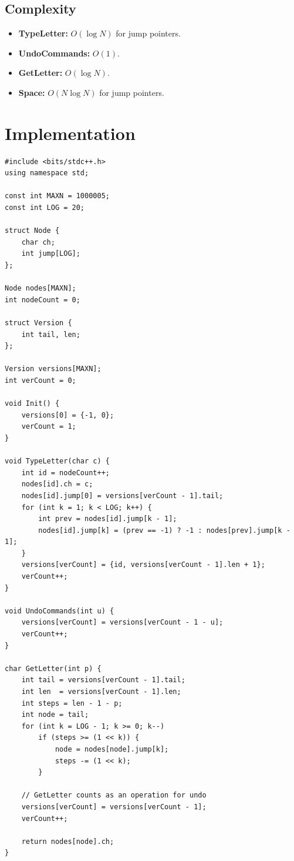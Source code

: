 \documentclass[11pt,a4paper]{article}
\begin{document}
\subsection{Complexity}
\begin{itemize}
    \item \textbf{TypeLetter:} $O(\log N)$ for jump pointers.
    \item \textbf{UndoCommands:} $O(1)$.
    \item \textbf{GetLetter:} $O(\log N)$.
    \item \textbf{Space:} $O(N \log N)$ for jump pointers.
\end{itemize}

\section{Implementation}

\begin{lstlisting}
#include <bits/stdc++.h>
using namespace std;

const int MAXN = 1000005;
const int LOG = 20;

struct Node {
    char ch;
    int jump[LOG];
};

Node nodes[MAXN];
int nodeCount = 0;

struct Version {
    int tail, len;
};

Version versions[MAXN];
int verCount = 0;

void Init() {
    versions[0] = {-1, 0};
    verCount = 1;
}

void TypeLetter(char c) {
    int id = nodeCount++;
    nodes[id].ch = c;
    nodes[id].jump[0] = versions[verCount - 1].tail;
    for (int k = 1; k < LOG; k++) {
        int prev = nodes[id].jump[k - 1];
        nodes[id].jump[k] = (prev == -1) ? -1 : nodes[prev].jump[k - 1];
    }
    versions[verCount] = {id, versions[verCount - 1].len + 1};
    verCount++;
}

void UndoCommands(int u) {
    versions[verCount] = versions[verCount - 1 - u];
    verCount++;
}

char GetLetter(int p) {
    int tail = versions[verCount - 1].tail;
    int len  = versions[verCount - 1].len;
    int steps = len - 1 - p;
    int node = tail;
    for (int k = LOG - 1; k >= 0; k--)
        if (steps >= (1 << k)) {
            node = nodes[node].jump[k];
            steps -= (1 << k);
        }

    // GetLetter counts as an operation for undo
    versions[verCount] = versions[verCount - 1];
    verCount++;

    return nodes[node].ch;
}
\end{lstlisting}
\end{document}
